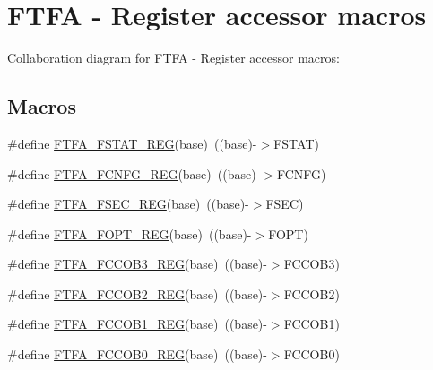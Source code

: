 \hypertarget{group___f_t_f_a___register___accessor___macros}{}\section{F\+T\+FA -\/ Register accessor macros}
\label{group___f_t_f_a___register___accessor___macros}
Collaboration diagram for F\+T\+FA -\/ Register accessor macros\+:
\subsection*{Macros}
\begin{DoxyCompactItemize}
\item 
\#define \hyperlink{group___f_t_f_a___register___accessor___macros_gaad0267e22158cd021a6d1ffb35879c81}{F\+T\+F\+A\+\_\+\+F\+S\+T\+A\+T\+\_\+\+R\+EG}(base)~((base)-\/$>$F\+S\+T\+AT)
\item 
\#define \hyperlink{group___f_t_f_a___register___accessor___macros_ga7a3092fe2c55e49fdf56c4e3c93bc643}{F\+T\+F\+A\+\_\+\+F\+C\+N\+F\+G\+\_\+\+R\+EG}(base)~((base)-\/$>$F\+C\+N\+FG)
\item 
\#define \hyperlink{group___f_t_f_a___register___accessor___macros_ga6f649f6743c50f29fd48ca36b219e82a}{F\+T\+F\+A\+\_\+\+F\+S\+E\+C\+\_\+\+R\+EG}(base)~((base)-\/$>$F\+S\+EC)
\item 
\#define \hyperlink{group___f_t_f_a___register___accessor___macros_ga0036dc77c7d72aab7d4111ba8eb52d2f}{F\+T\+F\+A\+\_\+\+F\+O\+P\+T\+\_\+\+R\+EG}(base)~((base)-\/$>$F\+O\+PT)
\item 
\#define \hyperlink{group___f_t_f_a___register___accessor___macros_gae685c7a7a80187d3c2d6f5404e5e3ebd}{F\+T\+F\+A\+\_\+\+F\+C\+C\+O\+B3\+\_\+\+R\+EG}(base)~((base)-\/$>$F\+C\+C\+O\+B3)
\item 
\#define \hyperlink{group___f_t_f_a___register___accessor___macros_gafb84447c23c2c9ee77f894f846161b5d}{F\+T\+F\+A\+\_\+\+F\+C\+C\+O\+B2\+\_\+\+R\+EG}(base)~((base)-\/$>$F\+C\+C\+O\+B2)
\item 
\#define \hyperlink{group___f_t_f_a___register___accessor___macros_gab2a718345513411b315eee6a7cfdb08a}{F\+T\+F\+A\+\_\+\+F\+C\+C\+O\+B1\+\_\+\+R\+EG}(base)~((base)-\/$>$F\+C\+C\+O\+B1)
\item 
\#define \hyperlink{group___f_t_f_a___register___accessor___macros_gae65af2867fb5ebe9330a3af6a7ecef75}{F\+T\+F\+A\+\_\+\+F\+C\+C\+O\+B0\+\_\+\+R\+EG}(base)~((base)-\/$>$F\+C\+C\+O\+B0)
\item 

\end{DoxyCompactItemize}

